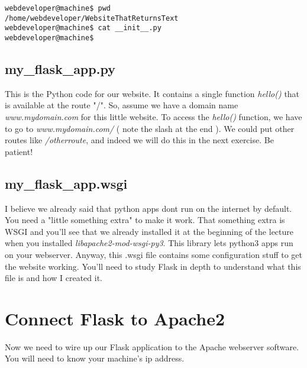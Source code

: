\documentclass[10pt]{article}
\begin{document}
\begin{lstlisting}[style=term, caption=Notice that \_\_init\_\_.py is empty]
webdeveloper@machine$ pwd 
/home/webdeveloper/WebsiteThatReturnsText
webdeveloper@machine$ cat __init__.py
webdeveloper@machine$ 
\end{lstlisting}

\subsection{my\_flask\_app.py}\label{sec:example1python}

This is the Python code for our website. It contains a single function
\textit{hello()} that is available at the route "/". So, assume we have a
domain name \textit{www.mydomain.com} for this little website. To access the
\textit{hello()} function, we have to go to \textit{www.mydomain.com/} ( note
the slash at the end ). We could put other routes like \textit{/otherroute}, and
indeed we will do this in the next exercise. Be patient!




\subsection{my\_flask\_app.wsgi}
\label{sec:example1wsgi}
I believe we already said that python apps dont run on the internet by default.
You need a "little something extra" to make it work. That something extra is
WSGI and you'll see that we already installed it at the beginning of the lecture
when you installed \textit{libapache2-mod-wsgi-py3}. This library lets python3
apps run on your webserver. Anyway, this .wsgi file contains some configuration
stuff to get the website working. You'll need to study Flask in depth to
understand what this file is and how I created it.




\section{Connect Flask to Apache2}
Now we need to wire up our Flask application to the Apache webserver software. You will need to know your machine's ip address.
\end{document}
